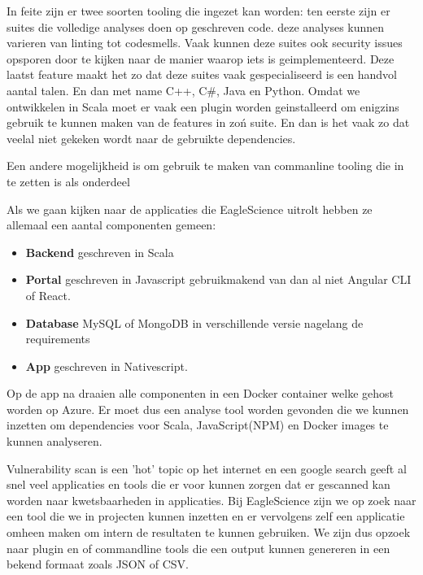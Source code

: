 In feite zijn er twee soorten tooling die ingezet kan worden: ten eerste zijn er suites die volledige analyses doen op geschreven code. deze analyses kunnen varieren van linting tot codesmells. Vaak kunnen deze suites ook security issues opsporen door te kijken naar de manier waarop iets is geimplementeerd. Deze laatst feature maakt het zo dat deze suites vaak gespecialiseerd is een handvol aantal talen. En dan met name C++, C#, Java en Python. Omdat we ontwikkelen in Scala moet er vaak een plugin worden geinstalleerd om enigzins gebruik te kunnen maken van de features in zo\'n suite. En dan is het vaak zo dat veelal niet gekeken wordt naar de gebruikte dependencies.

Een andere mogelijkheid is om gebruik te maken van commanline tooling die in te zetten is als onderdeel



Als we gaan kijken naar de applicaties die EagleScience uitrolt hebben ze allemaal een aantal componenten gemeen:
\begin{itemize}
    \item \textbf{Backend} geschreven in Scala
    \item \textbf{Portal} geschreven in Javascript gebruikmakend van dan al niet Angular CLI of React.
    \item \textbf{Database} MySQL of MongoDB in verschillende versie nagelang de requirements
    \item \textbf{App} geschreven in Nativescript.
\end{itemize}
Op de app na draaien alle componenten in een Docker container welke gehost worden op Azure. Er moet dus een analyse tool worden gevonden die we kunnen inzetten om dependencies voor Scala, JavaScript(NPM) en Docker images te kunnen analyseren.

Vulnerability scan is een 'hot' topic op het internet en een google search geeft al snel veel applicaties en tools die er voor kunnen zorgen dat er gescanned kan worden naar kwetsbaarheden in applicaties. Bij EagleScience zijn we op zoek naar een tool die we in projecten kunnen inzetten en er vervolgens zelf een applicatie omheen maken om intern de resultaten te kunnen gebruiken. We zijn dus opzoek naar plugin en of commandline tools die een output kunnen genereren in een bekend formaat zoals JSON of CSV.





